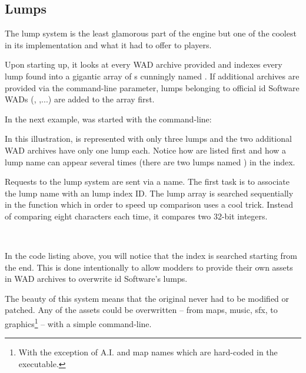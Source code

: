 \subsection{Lumps} \label{wad_detailled}
The lump system is the least glamorous part of the engine but one of the coolest in its implementation and what it had to offer to players.\\
\par
Upon starting up, it looks at every WAD archive provided and indexes every lump found into a gigantic array of s cunningly named . 
If additional archives are provided via the  command-line parameter, lumps belonging to official id Software WADs (, ,...) are added to the  array first.\\
\par
In the next example, \doom{} was started with the command-line:\\
\par
{}
\par
In this illustration,  is represented with only three lumps and the two additional WAD archives have only one lump each. Notice how  are listed first and how a lump name can appear several times (there are two lumps named ) in the index.\\
\par
{}
\par
Requests to the lump system are sent via a  name. The first task is to associate the lump name with an  lump index ID. The lump array is searched sequentially in the function  which in order to speed up comparison uses a cool trick. Instead of comparing eight characters each time, it compares two 32-bit integers.\\
\par
{}\\
\par
In the code listing above, you will notice that the index is searched starting from the end. This is done intentionally to allow modders to provide their own assets in WAD archives to overwrite id Software's lumps.\\
\par
The beauty of this system means that the original  never had to be modified or patched. Any of the assets could be overwritten -- from maps, music, sfx, to graphics\footnote{With the exception of A.I. and map names which are hard-coded in the executable.} -- with a simple command-line.\\
